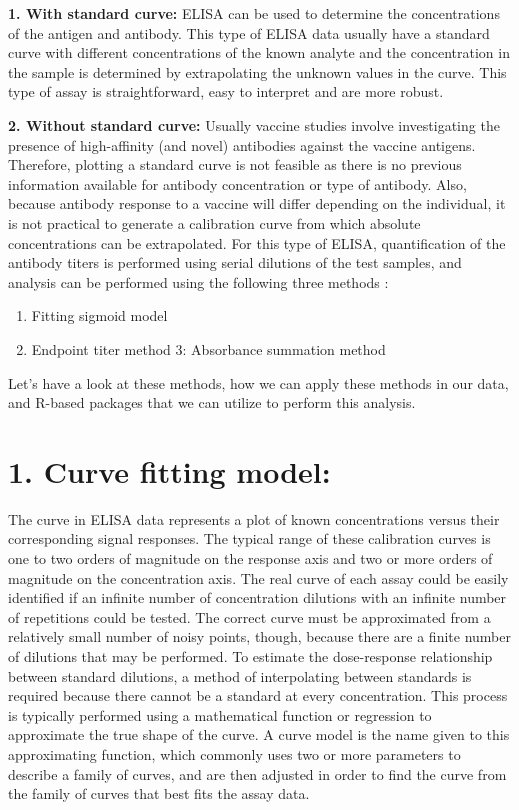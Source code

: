 \documentclass[
]{book}
\providecommand{\tightlist}{%
  \setlength{\itemsep}{0pt}\setlength{\parskip}{0pt}}
\begin{document}
\textbf{1. With standard curve:} ELISA can be used to determine the concentrations of the antigen and antibody. This type of ELISA data usually have a standard curve with
different concentrations of the known analyte and the concentration in the sample is determined by extrapolating the unknown values in the curve. This type of assay is straightforward, easy to interpret and are more robust.

\textbf{2. Without standard curve:} Usually vaccine studies involve investigating the presence of high-affinity (and novel) antibodies against the vaccine antigens.
Therefore, plotting a standard curve is not feasible as there is no previous information available for antibody concentration or type of antibody. Also, because antibody response to a vaccine will differ depending on the individual,
it is not practical to generate a calibration curve from which absolute concentrations can be extrapolated.
For this type of ELISA, quantification of the antibody titers is performed using serial dilutions of the test samples, and analysis can be performed using the following three methods \citep{hartman2018absorbance}:

\begin{enumerate}
\def\labelenumi{\arabic{enumi}.}
\tightlist
\item
  Fitting sigmoid model
\item
  Endpoint titer method
  3: Absorbance summation method
\end{enumerate}

Let's have a look at these methods, how we can apply these methods in our data, and R-based packages that we can utilize to perform this analysis.

\hypertarget{curve-fitting-model}{%
\section{\texorpdfstring{\textbf{1. Curve fitting model:}}{1. Curve fitting model:}}\label{curve-fitting-model}}

The curve in ELISA data represents a plot of known concentrations versus their corresponding signal responses. The typical range of these calibration curves is one to two orders of magnitude on the response axis and two or more orders of magnitude on the concentration axis. The real curve of each assay could be easily identified if an infinite number of concentration dilutions with an infinite number of repetitions could be tested. The correct curve must be approximated from a relatively small number of noisy points, though, because there are a finite number of dilutions that may be performed. To estimate the dose-response relationship between standard dilutions, a method of interpolating between standards is required because there cannot be a standard at every concentration. This process is typically performed using a mathematical function or regression to approximate the true shape of the curve. A curve model is the name given to this approximating function, which commonly uses two or more parameters to describe a family of curves, and are then adjusted in order to find the curve from the family of curves that best fits the assay data.
\end{document}
